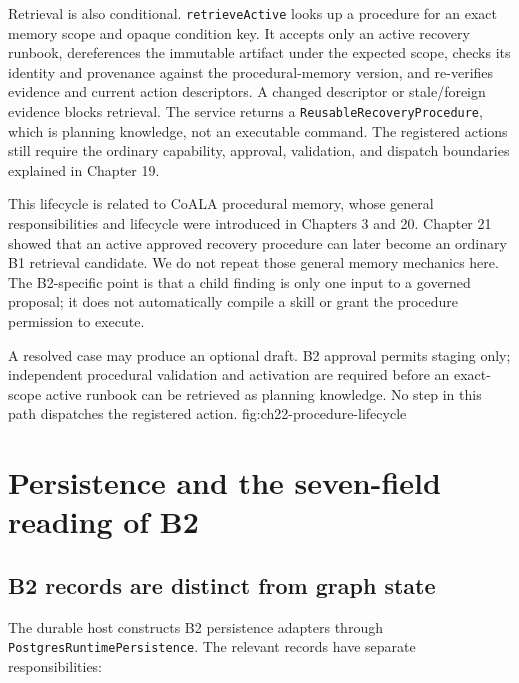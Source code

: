 Retrieval is also conditional. \texttt{retrieveActive} looks up a procedure for an exact memory scope and opaque condition key. It accepts only an active recovery runbook, dereferences the immutable artifact under the expected scope, checks its identity and provenance against the procedural-memory version, and re-verifies evidence and current action descriptors. A changed descriptor or stale/foreign evidence blocks retrieval. The service returns a \texttt{Reusable\allowbreak Recovery\allowbreak Procedure}, which is planning knowledge, not an executable command. The registered actions still require the ordinary capability, approval, validation, and dispatch boundaries explained in Chapter 19.

This lifecycle is related to CoALA procedural memory, whose general responsibilities and lifecycle were introduced in Chapters 3 and 20. Chapter 21 showed that an active approved recovery procedure can later become an ordinary B1 retrieval candidate. We do not repeat those general memory mechanics here. The B2-specific point is that a child finding is only one input to a governed proposal; it does not automatically compile a skill or grant the procedure permission to execute.

  {A resolved case may produce an optional draft. B2 approval permits staging only; independent procedural validation and activation are required before an exact-scope active runbook can be retrieved as planning knowledge. No step in this path dispatches the registered action.}
  {fig:ch22-procedure-lifecycle}

\section{Persistence and the seven-field reading of B2}
\label{sec:ch22-persistence-seven-fields}

\subsection{B2 records are distinct from graph state}
\label{subsec:ch22-b2-persistence}

The durable host constructs B2 persistence adapters through \texttt{Postgres\allowbreak Runtime\allowbreak Persistence}. The relevant records have separate responsibilities:

